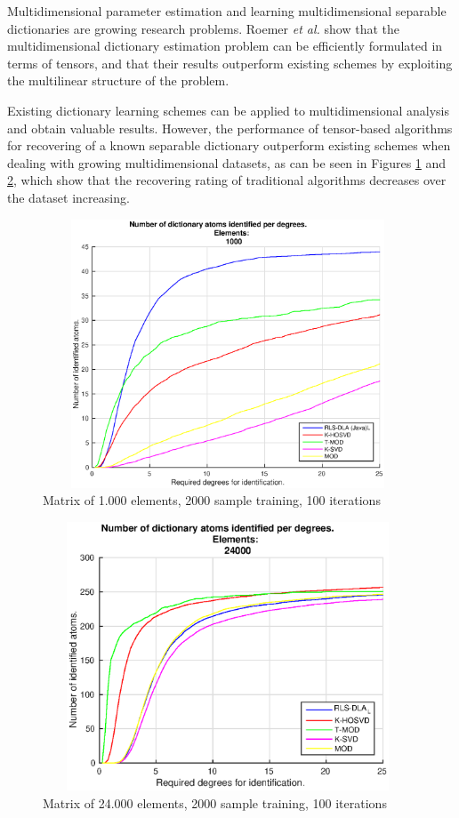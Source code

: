 Multidimensional parameter estimation and learning multidimensional separable dictionaries are growing research problems. Roemer \emph{et al.} \cite{roemer2014tensor} show that the multidimensional dictionary estimation problem can be efficiently formulated in terms of tensors, and that their results outperform existing schemes by exploiting the multilinear structure of the problem.

Existing dictionary learning schemes can be applied to multidimensional analysis and obtain valuable results. However, the performance of tensor-based algorithms for recovering of a known separable dictionary outperform existing schemes when dealing with growing multidimensional datasets, as can be seen in Figures \ref{fig:fig1} and \ref{fig:fig2}, which show that the recovering rating of traditional algorithms decreases over the dataset increasing.

\begin{figure}[!htb]
     \centering 
	 \includegraphics[height=8cm, width=11cm]{figures/5_20_2000_1000_100.eps}
     \caption{Matrix of 1.000 elements, 2000 sample training, 100 iterations}
     \label{fig:fig1}
\end{figure}

\begin{figure}[!htb]
     \centering 
	 \includegraphics[height=8cm, width=11cm]{figures/5_20_2000_24000_100.eps}
     \caption{Matrix of 24.000 elements, 2000 sample training, 100 iterations}
     \label{fig:fig2}
\end{figure}

